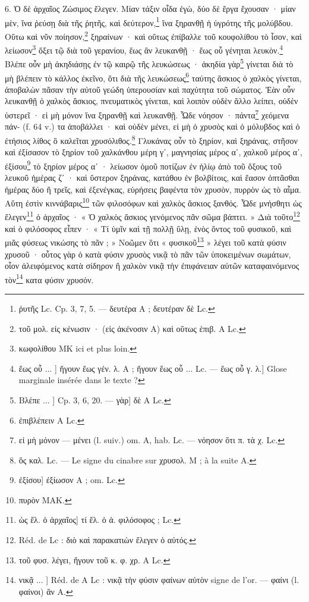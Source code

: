 \documentclass[a4paper, 11pt, oneside, polutonikogreek, french]{article}
\begin{document}
6. Ὁ δὲ ἀρχαῖος Ζώσιμος ἔλεγεν. Μίαν τάξιν οἶδα ἐγὼ, δύο δὲ ἔργα ἔχουσαν · μίαν μὲν, ἵνα ῥεύσῃ διὰ τῆς ῥητῆς, καὶ δεύτερον,\footnote{ῥυτῆς Lc. Cp. 3, 7, 5. --- δευτέρα A ; δευτέραν δὲ Lc.} ἵνα ξηρανθῇ ἡ ὑγρότης τῆς μολύβδου. Οὕτω καὶ νῦν ποίησον,\footnote{τοῦ μολ. εἰς κένωσιν · (εἰς ἀκένοσιν A) καὶ οὕτως ἐπιβ. A Lc.} ξηραίνων · καὶ οὕτως ἐπίβαλλε τοῦ κουφολίθου τὸ ἶσον, καὶ λείωσον\footnote{κωφολίθου MK ici et plus loin.} ὄξει τῷ διὰ τοῦ γερανίου, ἕως ἂν λευκανθῇ · ἕως οὗ γένηται λευκὸν.\footnote{ἕως οὗ ... ] ἤγουν ἕως γέν. λ. A ; ἤγουν ἕως οὗ ... Lc. --- ἕως οὗ γ. λ.] Glose marginale insérée dans le texte ?} Βλέπε οὖν μὴ ἀκηδιάσῃς ἐν τῷ καιρῷ τῆς λευκώσεως · ἀκηδία γὰρ\footnote{Βλέπε ... ] Cp. 3, 6, 20. --- γὰρ] δὲ A Lc.} γίνεται διὰ τὸ μὴ βλέπειν τὸ κάλλος ἐκεῖνο, ὅτι διὰ τῆς λευκώσεως\footnote{ἐπιβλέπειν A Lc.} ταύτης ἄσκιος ὁ χαλκὸς γίνεται, ἀποβαλὼν πᾶσαν τὴν αὐτοῦ γεώδη ὑπερουσίαν καὶ παχύτητα τοῦ σώματος. Ἐὰν οὖν λευκανθῇ ὁ χαλκὸς ἄσκιος, πνευματικὸς γίνεται, καὶ λοιπὸν οὐδὲν ἄλλο λείπει, οὐδὲν ὑστερεῖ · εἰ μὴ μόνον ἵνα ξηρανθῇ καὶ λευκανθῇ. Ὧδε νόησον · πάντα\footnote{εἰ μὴ μόνον --- μένει (l. suiv.) om. A, hab. Lc. --- νόησον ὅτι π. τὰ χ. Lc.} χεόμενα πάν- (f. 64 v.) τα ἀποβάλλει · καὶ οὐδὲν μένει, εἰ μὴ ὁ χρυσὸς καὶ ὁ μόλυβδος καὶ ὁ ἐτήσιος λίθος ὃ καλεῖται χρυσόλιθος.\footnote{ὃς καλ. Lc. --- Le signe du cinabre sur χρυσολ. M ; à la suite A.} Γλυκάνας οὖν τὸ ξηρίον, καὶ ξηράνας, στῆσον καὶ ἐξίσασον τὸ ξηρίον τοῦ χαλκάνθου μέρη γʹ, μαγνησίας μέρος αʹ, χαλκοῦ μέρος αʹ, ἐξίσου\footnote{ἐξίσου] ἐξίωσον A ; om. Lc.} τὸ ξηρίον μέρος αʹ · λείωσον ὁμοῦ ποτίζων ἐν ἡλίῳ ἀπὸ τοῦ ὄξους τοῦ λευκοῦ ἡμέρας ζʹ · καὶ ὕστερον ξηράνας, κατάθου ἐν βολβίτοις, καὶ ἔασον ὀπτᾶσθαι ἡμέρας δύο ἢ τρεῖς, καὶ ἐξενέγκας, εὑρήσεις βαφέντα τὸν χρυσὸν, πυρρὸν ὡς τὸ αἷμα. Αὕτη ἐστὶν κιννάβαρις\footnote{πυρὸν MAK.} τῶν φιλοσόφων καὶ χαλκὸς ἄσκιος ξανθός. Ὧδε μνήσθητι ὡς ἔλεγεν\footnote{ὡς ἔλ. ὁ ἀρχαῖος] τί ἔλ. ὁ ἀ. φιλόσοφος ; Lc.} ὁ ἀρχαῖος · « Ὁ χαλκὸς ἄσκιος γενόμενος πᾶν σῶμα βάπτει. » Διὰ τοῦτο\footnote{Réd. de Lc : διὸ καὶ παρακατιὼν ἔλεγεν ὁ αὐτός.} καὶ ὁ φιλόσοφος εἶπεν · « Τί ὑμῖν καὶ τῇ πολλῇ ὕλῃ, ἑνὸς ὄντος τοῦ φυσικοῦ, καὶ μιᾶς φύσεως νικώσης τὸ πᾶν ; » Νοῶμεν ὃτι « φυσικοῦ\footnote{τοῦ φυσ. λέγει, ἤγουν τοῦ κ. φ. χρ. A Lc.} » λέγει τοῦ κατὰ φύσιν χρυσοῦ · οὗτος γὰρ ὁ κατὰ φύσιν χρυσὸς νικᾷ τὸ πᾶν τῶν ὑποκειμένων σωμάτων, οἷον ἀλειφόμενος κατὰ σίδηρον ἢ χαλκὸν νικᾷ τὴν ἐπιφάνειαν αὐτῶν καταφαινόμενος τὸν\footnote{νικᾷ ... ] Réd. de A Lc : νικᾷ τὴν φύσιν φαίνων αὐτὸν signe de l'or. --- φαίνι (l. φαίνοι) ἂν A.} κατα φύσιν χρυσόν.
\end{document}
